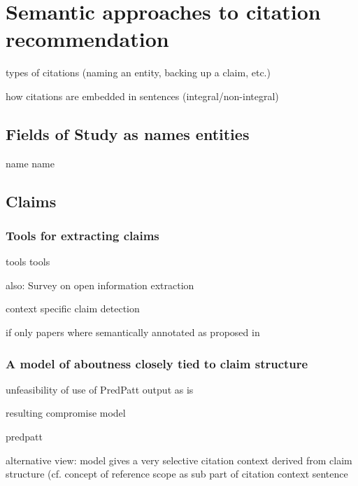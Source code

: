 \chapter{Semantic approaches to citation recommendation}\label{chap:approach}
types of citations (naming an entity, backing up a claim, etc.)

how citations are embedded in sentences (integral/non-integral\cite{Swales1990,Hyland1999,Thompson2001,Okamura2008,Lamers2018})

\section{Fields of Study as names entities}
name name

\section{Claims}
\subsection{Tools for extracting claims}
tools tools

also: Survey on open information extraction\cite{Niklaus2018}

context specific claim detection\cite{Levy2014}

if only papers where semantically annotated as proposed in \cite{BuckinghamShum2000}
\subsection{A model of aboutness closely tied to claim structure}
unfeasibility of use of PredPatt output as is

resulting compromise model

predpatt\cite{White2016,Zhang2017}

alternative view: model gives a very selective citation context derived from claim structure (cf. concept of reference scope as sub part of citation context sentence\cite{Abujbara2012,RAHUL2017}
